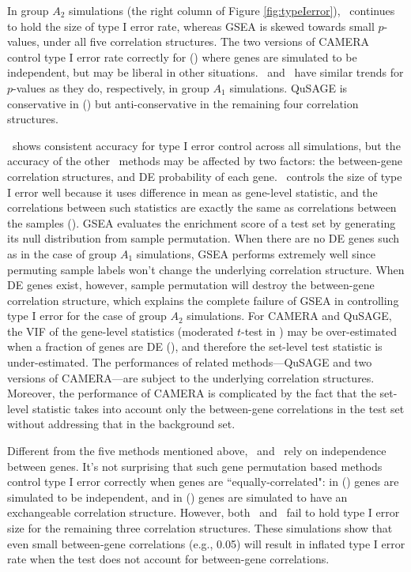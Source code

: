 	In group $A_2$ simulations (the right column of Figure \ref{fig:typeIerror}),  
	\OurMethod~continues to hold the size of type I error rate, whereas GSEA is skewed towards 
	small $p$-values, under all five correlation structures. The two versions of CAMERA control 
	type I error rate correctly for	(\aaCase) where genes are simulated to be independent, but may 
	be liberal in other situations.
	\gent~and \genr~have similar trends for $p$-values as they do, respectively, in group $A_1$
	simulations. QuSAGE is conservative in (\cCase) but anti-conservative in the remaining four
	correlation structures.
	

	
	\OurMethod~shows consistent accuracy for type I error control across all simulations, but the
	accuracy of the other \HowmanyTest~methods may be affected by two factors: the between-gene
	correlation structures, and DE probability of each gene. %
	\OurMethod~controls the size of type I error well because it uses difference in mean as 
	gene-level statistic, and the correlations between such statistics are exactly the same as 
	correlations between the samples (\thepapertobefinished). GSEA evaluates the enrichment score
	of a test set by generating its null distribution from sample permutation. When there are no DE 
	genes such as in the case of group $A_1$ simulations, GSEA performs extremely well since 
	permuting sample labels won't change the underlying correlation structure. When DE genes exist, 
	however, sample	permutation will destroy the between-gene correlation structure, which 
	explains the complete failure of GSEA in controlling type I error for the case of group $A_2$ 
	simulations. For CAMERA and QuSAGE, the VIF of the gene-level statistics (moderated $t$-test in 
	\cite{wu2012camera}) may be	over-estimated when a fraction of genes are DE 
	(\thepapertobefinished), and therefore the set-level test statistic is under-estimated. The 
	performances of related methods---QuSAGE and two versions of
	CAMERA---are subject to the underlying correlation structures. Moreover, the performance of 
	CAMERA is complicated by the fact that the set-level statistic takes into account only the 
	between-gene correlations in the test set without addressing that in 
	the	background set.
	
	Different from the five methods mentioned above, \gent~and \genr~rely on independence between
	genes. It's not surprising that such gene permutation based methods control type I
	error correctly when genes are ``equally-correlated": in (\aaCase) genes are simulated to be
	independent, and in (\cCase) genes are simulated to have an exchangeable correlation structure.
	However, both \gent~and \genr~fail to hold type I error size for the remaining three correlation
	structures. These simulations show that even small between-gene correlations (e.g., 0.05) will 
	result in inflated type I error rate when the test does not account for between-gene 
	correlations.  
	
